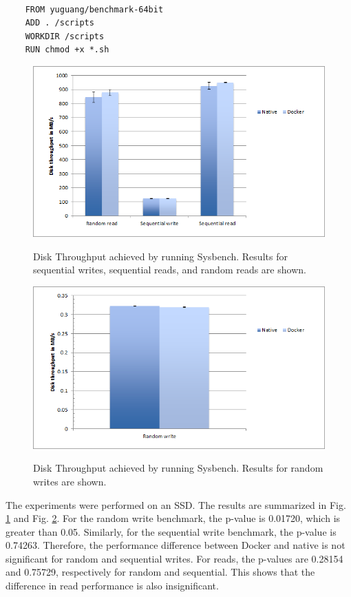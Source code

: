 \documentclass[11pt]{article}
\begin{document}
	\lstset{caption=Dockerfile for Building Benchmark Image, label=lst:dockerfile}
	\begin{lstlisting}
	
	FROM yuguang/benchmark-64bit
	ADD . /scripts
	WORKDIR /scripts
	RUN chmod +x *.sh
	\end{lstlisting}
	
	
	\begin{figure}
		\centering
		{\includegraphics[width=150mm]{disk1}}
		\caption{ Disk Throughput achieved by running Sysbench.
			Results for sequential writes, sequential reads, and random reads are shown.
		}
		\label{fig:disk1}
	\end{figure}
	
	\begin{figure}
		\centering
		{\includegraphics[width=150mm]{disk2}}
		\caption{ Disk Throughput achieved by running Sysbench.
			Results for random writes are shown.
		}
		\label{fig:disk2}
	\end{figure}
	
	The experiments were performed on an SSD. The results are summarized in Fig. \ref{fig:disk1} and Fig. \ref{fig:disk2}. For the random write benchmark, the p-value is 0.01720, which is greater than 0.05. Similarly, for the sequential write benchmark, the p-value is 0.74263. Therefore, the performance difference between Docker and native is not significant for random and sequential writes. For reads, the p-values are 0.28154 and 0.75729, respectively for random and sequential. This shows that the difference in read performance is also insignificant.  
	
\end{document}
